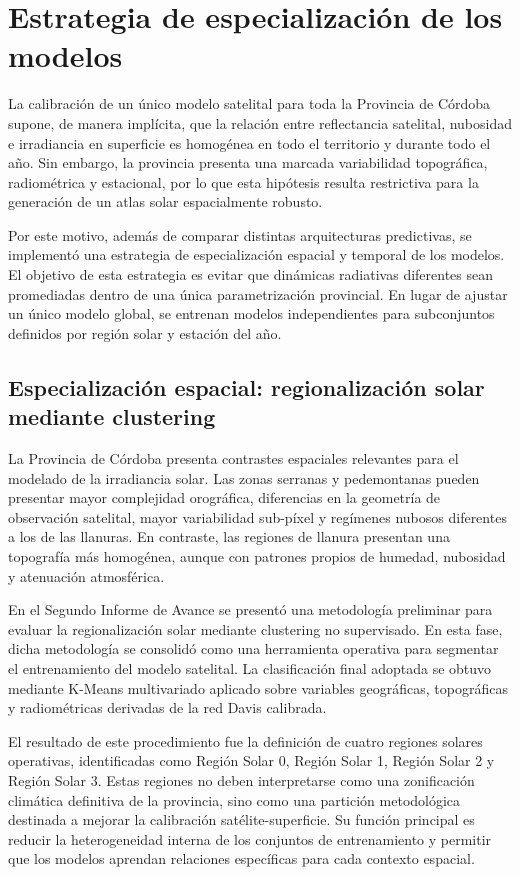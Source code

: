 \documentclass[../main.tex]{subfiles}
\begin{document}
    
\section{Estrategia de especialización de los modelos}

La calibración de un único modelo satelital para toda la Provincia de Córdoba supone, de manera implícita, que la relación entre reflectancia satelital, nubosidad e irradiancia en superficie es homogénea en todo el territorio y durante todo el año. Sin embargo, la provincia presenta una marcada variabilidad topográfica, radiométrica y estacional, por lo que esta hipótesis resulta restrictiva para la generación de un atlas solar espacialmente robusto.

Por este motivo, además de comparar distintas arquitecturas predictivas, se implementó una estrategia de especialización espacial y temporal de los modelos. El objetivo de esta estrategia es evitar que dinámicas radiativas diferentes sean promediadas dentro de una única parametrización provincial. En lugar de ajustar un único modelo global, se entrenan modelos independientes para subconjuntos definidos por región solar y estación del año.

\subsection{Especialización espacial: regionalización solar mediante clustering}

La Provincia de Córdoba presenta contrastes espaciales relevantes para el modelado de la irradiancia solar. Las zonas serranas y pedemontanas pueden presentar mayor complejidad orográfica, diferencias en la geometría de observación satelital, mayor variabilidad sub-píxel y regímenes nubosos diferentes a los de las llanuras. En contraste, las regiones de llanura presentan una topografía más homogénea, aunque con patrones propios de humedad, nubosidad y atenuación atmosférica.

En el Segundo Informe de Avance se presentó una metodología preliminar para evaluar la regionalización solar mediante clustering no supervisado. En esta fase, dicha metodología se consolidó como una herramienta operativa para segmentar el entrenamiento del modelo satelital. La clasificación final adoptada se obtuvo mediante K-Means multivariado \cite{scikit-learn} aplicado sobre variables geográficas, topográficas y radiométricas derivadas de la red Davis calibrada.

El resultado de este procedimiento fue la definición de cuatro regiones solares operativas, identificadas como Región Solar 0, Región Solar 1, Región Solar 2 y Región Solar 3. Estas regiones no deben interpretarse como una zonificación climática definitiva de la provincia, sino como una partición metodológica destinada a mejorar la calibración satélite-superficie. Su función principal es reducir la heterogeneidad interna de los conjuntos de entrenamiento y permitir que los modelos aprendan relaciones específicas para cada contexto espacial.
\end{document}

